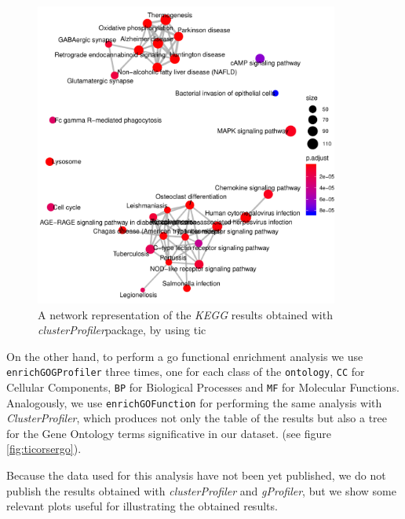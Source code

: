 \begin{figure}[H]
\centering
\includegraphics[width=10cm, keepaspectratio]{img/ticorser/functional/net_kegg.pdf}
\caption[ticorser pathway network]{A network representation of the \textit{KEGG} results obtained with \textit{clusterProfiler}package, by using \gls{tic}}
\label{fig:ticorserpathmap}
\end{figure}

On the other hand, to perform a \gls{go} functional enrichment analysis we use \lstinline!enrichGOGProfiler! three times, one for each class of the \lstinline!ontology!, \lstinline!CC! for Cellular Components, \lstinline!BP! for Biological Processes and \lstinline!MF! for Molecular Functions.
Analogously, we use \lstinline!enrichGOFunction! for performing the same analysis with \textit{ClusterProfiler}, which produces not only the table of the results but also a tree for the Gene Ontology terms significative in our dataset. (see figure \ref{fig:ticorsergo}).

Because the data used for this analysis have not been yet published, we do not publish the results obtained with \textit{clusterProfiler} and \textit{gProfiler}, but we show some relevant plots useful for illustrating the obtained results.

